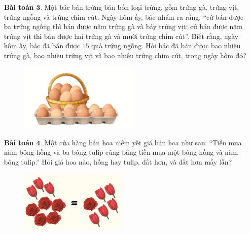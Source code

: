 	\textbf{Bài toán $\pmb{3.}$} Một bác bán trứng bán bốn loại trứng, gồm trứng gà, trứng vịt, trứng ngỗng và trứng chim cút. Ngày hôm ấy, bác nhẩm ra rằng, “cứ bán được ba trứng ngỗng thì bán được năm trứng gà và bảy trứng vịt; cứ bán được năm trứng vịt thì bán được hai trứng gà và mười trứng chim cút”. Biết rằng, ngày hôm ấy, bác đã bán được $15$ quả trứng ngỗng. Hỏi bác đã bán được bao nhiêu trứng gà, bao nhiêu trứng vịt và bao nhiêu trứng chim cút, trong ngày hôm đó?
	\begin{figure}[H]
		\centering
		\vspace*{-5pt}
		\captionsetup{labelformat= empty, justification=centering}
		\includegraphics[width=0.53\textwidth]{pic6}
		\vspace*{-5pt}
	\end{figure}
	\textbf{Bài toán $\pmb{4.}$} Một cửa hàng bán hoa niêm yết giá bán hoa như sau:
	\vskip 0.15cm
	“Tiền mua năm bông hồng và ba bông tulip cũng bằng tiền mua một bông hồng và năm bông tulip.”
	\vskip 0.15cm
	Hỏi giá hoa nào, hồng hay tulip, đắt hơn, và đắt hơn mấy lần?
	\begin{figure}[H]
		\centering
		\vspace*{-5pt}
		\captionsetup{labelformat= empty, justification=centering}
		\includegraphics[width=0.47\textwidth]{pic5}
		\vspace*{-5pt}
	\end{figure}